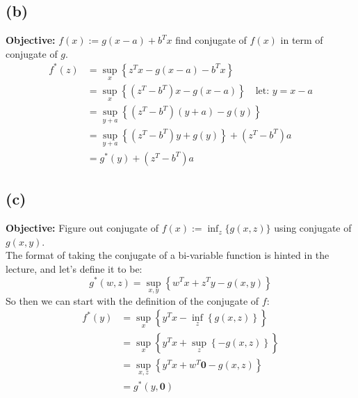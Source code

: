 \documentclass[]{article}
\begin{document}
    \subsection*{(b)}
        \textbf{Objective:} $f(x):= g(x - a) + b^Tx$ find conjugate of $f(x)$ in term of conjugate of $g$. 
        \begin{align*}\tag{2b1}\label{eqn:2b1}
            f^*(z) &= \sup_x \left\lbrace
                z^Tx - g(x - a) - b^Tx
            \right\rbrace 
            \\
            &= \sup_x \left\lbrace
                (z^T - b^T)x - g(x - a)
            \right\rbrace \quad \text{let: } y = x - a
            \\
            &= \sup_{y + a} \left\lbrace
                (z^T - b^T)(y + a) - g(y)
            \right\rbrace
            \\
            &= 
            \sup_{y + a} \left\lbrace
                (z^T - b^T)y + g(y)
            \right\rbrace + (z^T - b^T)a
            \\
            &= g^*(y) + (z^T - b^T)a
        \end{align*}
    \subsection*{(c)}
        \textbf{Objective:} Figure out conjugate of $f(x):= \inf_z \{g(x, z)\}$ using conjugate of $g(x, y)$. 
        \\
        The format of taking the conjugate of a bi-variable function is hinted in the lecture, and let's define it to be: 
        $$
            g^*(w, z) = \sup_{x, y} \left\lbrace
                w^Tx + z^Ty - g(x, y)
            \right\rbrace
        $$
        So then we can start with the definition of the conjugate of $f$: 
        \begin{align*}\tag{2c1}\label{eqn:2c1}
            f^*(y) &= \sup_x \left\lbrace
                y^Tx - \inf_z \left\lbrace
                    g(x, z)
                \right\rbrace
            \right\rbrace
            \\
            &= \sup_x \left\lbrace
                y^Tx + \sup_z \left\lbrace
                    -g(x, z)
                \right\rbrace
            \right\rbrace
            \\
            &= \sup_{x, z} \left\lbrace
                y^Tx + w^T\mathbf{0} - g(x, z)
            \right\rbrace
            \\
            &= g^*(y, \mathbf{0})
        \end{align*}
\end{document}
